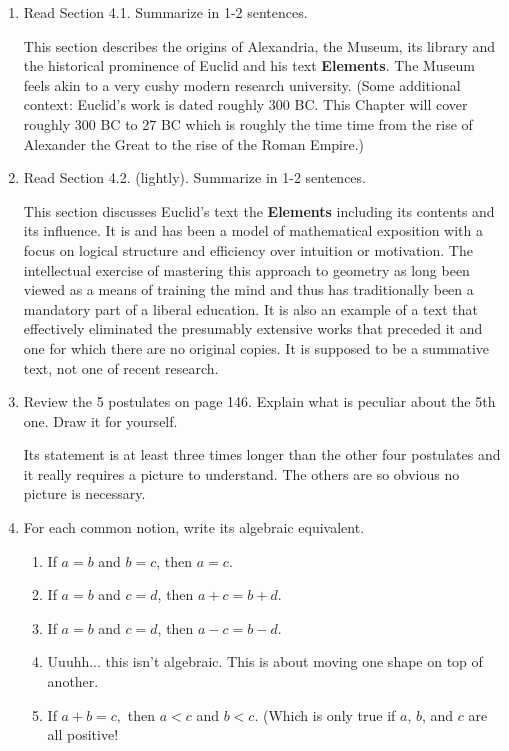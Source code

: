 \documentclass[12pt]{article}
\renewcommand{\emph}[1]{\textsf{\textbf{#1}}}
\begin{document}
\begin{enumerate}
\item Read Section 4.1. Summarize in 1-2 sentences.

This section describes the origins of Alexandria, the Museum, its library and the historical prominence of Euclid and his text \emph{Elements}. The Museum feels akin to a very cushy modern research university. (Some additional context: Euclid's work is dated roughly 300 BC. This Chapter will cover roughly 300 BC to 27 BC which is roughly the time time from the rise of Alexander the Great to the rise of the Roman Empire.)

\item Read Section 4.2. (lightly). Summarize in 1-2 sentences.

This section discusses Euclid's text the \emph{Elements} including its contents and its influence. It is and has been a model of mathematical exposition with a focus on logical structure and efficiency over intuition or motivation. The intellectual exercise of mastering this approach to geometry as long been viewed as a means of training the mind and thus has traditionally been a mandatory part of a liberal education. It is also an example of a text that effectively eliminated the presumably extensive works that preceded it and one for which there are no original copies. It is supposed to be a summative text, not one of recent research.

\item Review the 5 postulates on page 146. Explain what is peculiar about the 5th one. Draw it for yourself.

Its statement is at least three times longer than the other four postulates and it really requires a picture to understand. The others are so obvious no picture is necessary.

\vfill
\item For each common notion, write its algebraic equivalent.
\begin{enumerate}
\item If $a=b$ and $b=c$, then $a=c.$
\item If $a=b$ and $c=d$, then $a+c=b+d.$
\item If $a=b$ and $c=d$, then $a-c=b-d.$
\item Uuuhh... this isn't algebraic. This is about moving one shape on top of another.
\item If $a+b=c,$ then $a<c$ and $b<c.$ (Which is only true if $a$, $b$, and $c$ are all positive!
\end{enumerate}


\end{enumerate}
\end{document}
